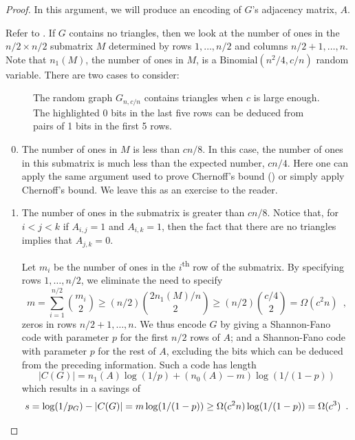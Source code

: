 \documentclass{patmorin}
\begin{document}
\begin{proof}
  In this argument, we will produce an encoding of $G$'s adjacency
  matrix, $A$.

  Refer to .  If $G$ contains no triangles, then we
  look at the number of ones in the $n/2\times n/2$ submatrix $M$
  determined by rows $1,\ldots,n/2$ and columns $n/2+1,\ldots,n$. Note
  that $n_1(M)$, the number of ones in $M$, is a
  $\mathrm{Binomial}(n^2/4, c/n)$ random variable.  There are two
  cases to consider:
  
  \begin{figure}
    \caption{The random graph $G_{n,c/n}$ contains triangles when $c$
      is large enough.  The highlighted 0 bits in the last five rows
      can be deduced from pairs of 1 bits in the first 5 rows.}
  \end{figure}

  \begin{enumerate}\setcounter{enumi}{-1}
  \item The number of ones in $M$ is less than $cn/8$.  In this case,
    the number of ones in this submatrix is much less than the
    expected number, $cn/4$.  Here one can apply the same argument
    used to prove Chernoff's bound () or simply apply
    Chernoff's bound. We leave this as an exercise to the reader.

  \item The number of ones in the submatrix is greater than $cn/8$.
    Notice that, for $i<j<k$ if $A_{i,j}=1$ and $A_{i,k}=1$, then the
    fact that there are no triangles implies that $A_{j,k}=0$.

    Let $m_i$ be the number of ones in the $i$\textsuperscript{th} row
    of the submatrix.  By specifying rows $1,\ldots,n/2$, we eliminate
    the need to specify
    \[
      m = \sum_{i=1}^{n/2}\binom{m_i}{2} \ge (n/2) \binom{2
        n_1(M)/n}{2} \ge (n/2)\binom{c/4}{2} = \Omega(c^2n) \enspace ,
    \]
    zeros in rows $n/2+1,\ldots,n$. We thus encode $G$ by giving a
    Shannon-Fano code with parameter $p$ for the first $n/2$ rows of
    $A$; and a Shannon-Fano code with parameter $p$ for the rest of
    $A$, excluding the bits which can be deduced from the preceding
    information. Such a code has length
    \[
      |C(G)| = n_1(A) \log(1/p) + (n_0(A)-m)\log(1/(1-p))
    \]
    which results in a savings of
    \[
      s = \log(1/p_G) - |C(G)| = m\log(1/(1-p)) \ge
      \Omega(c^2n)\log(1/(1-p)) = \Omega(c^3) \enspace . \qedhere
    \]
  \end{enumerate}
\end{proof}
\end{document}
